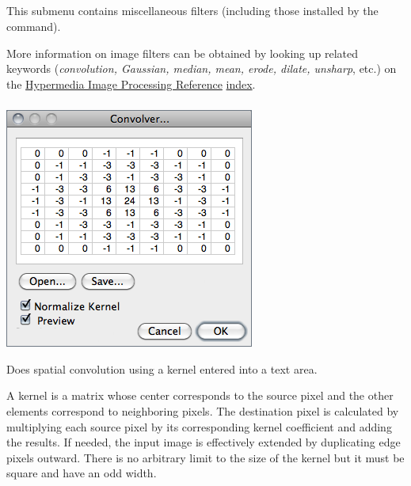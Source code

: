 \subsection[\protect\userinterface{Filters\lyxarrow{}}]{\protect{}\label{sub:Filters}}

This submenu contains miscellaneous filters \cite{C-MultiThreadFilters}
(including those installed by the 
command). 

More information on image filters can be obtained by looking up related
keywords (\emph{convolution, Gaussian, median, mean, erode, dilate,
unsharp}, etc.) on the \href{http://homepages.inf.ed.ac.uk/rbf/HIPR2/}{Hypermedia Image Processing Reference}\emph{
}\href{http://homepages.inf.ed.ac.uk/rbf/HIPR2/index.htm}{index}.




\subsubsection[\protect\userinterface{Convolve\ldots{}}]{\protect{}\label{sub:Convolve...}}

\begin{minipage}[c][1\totalheight][t]{0.435\columnwidth}%
\includegraphics[scale=0.55]{images/Convolve}%
\end{minipage}%
\begin{minipage}[c][1\totalheight][t]{0.565\columnwidth}%
Does spatial convolution using a kernel entered into a text area.
\medskip{}


A kernel is a matrix whose center corresponds to the source pixel
and the other elements correspond to neighboring pixels. The destination
pixel is calculated by multiplying each source pixel by its corresponding
kernel coefficient and adding the results. If needed, the input image
is effectively extended by duplicating edge pixels outward. There
is no arbitrary limit to the size of the kernel but it must be square
and have an odd width.%
\end{minipage}

